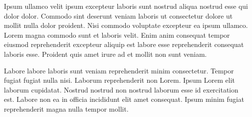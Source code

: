 \documentclass{article}
\begin{document}
Ipsum ullamco velit ipsum excepteur laboris sunt nostrud aliqua nostrud esse qui dolor dolor. Commodo sint deserunt veniam laboris ut consectetur dolore ut mollit nulla dolor proident. Nisi commodo voluptate excepteur ea ipsum ullamco. Lorem magna commodo sunt et laboris velit. Enim anim consequat tempor eiusmod reprehenderit excepteur aliquip est labore esse reprehenderit consequat laboris esse. Proident quis amet irure ad et mollit non sunt veniam.

Labore labore laboris sunt veniam reprehenderit minim consectetur. Tempor fugiat fugiat nulla nisi. Laborum reprehenderit non Lorem. Ipsum Lorem elit laborum cupidatat. Nostrud nostrud non nostrud laborum esse id exercitation est. Labore non ea in officia incididunt elit amet consequat. Ipsum minim fugiat reprehenderit magna nulla tempor mollit.
\end{document}
